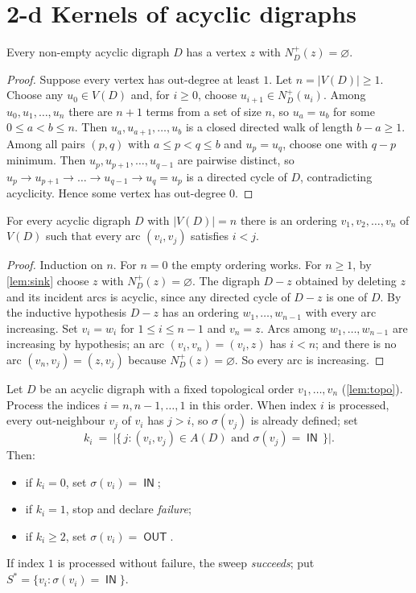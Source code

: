 \documentclass[11pt]{article}
\numberwithin{equation}{section}
\theoremstyle{plain}
\newcommand{\V}{V}
\newcommand{\A}{A}
\newcommand{\Np}{N^{+}}
\newcommand{\st}{\sigma}                   %
\DeclareMathOperator{\IN}{\mathsf{IN}}
\DeclareMathOperator{\OUT}{\mathsf{OUT}}
\begin{document}
\section{2-d Kernels of acyclic digraphs}
\label{sec:dag}

\begin{lemma}\label{lem:sink}
Every non-empty acyclic digraph $D$ has a vertex $z$ with $\Np_D(z)=\varnothing$.
\end{lemma}

\begin{proof}
Suppose every vertex has out-degree at least $1$. Let $n=|\V(D)|\ge 1$. Choose any
$u_0\in\V(D)$ and, for $i\ge 0$, choose $u_{i+1}\in\Np_D(u_i)$. Among $u_0,u_1,\dots,u_n$
there are $n+1$ terms from a set of size $n$, so $u_a=u_b$ for some $0\le a<b\le n$. Then
$u_a,u_{a+1},\dots,u_b$ is a closed directed walk of length $b-a\ge 1$. Among all pairs
$(p,q)$ with $a\le p<q\le b$ and $u_p=u_q$, choose one with $q-p$ minimum. Then
$u_p,u_{p+1},\dots,u_{q-1}$ are pairwise distinct, so
$u_p\to u_{p+1}\to\dots\to u_{q-1}\to u_q=u_p$ is a directed cycle of $D$, contradicting
acyclicity. Hence some vertex has out-degree $0$.
\end{proof}

\begin{lemma}\label{lem:topo}
For every acyclic digraph $D$ with $|\V(D)|=n$ there is an ordering
$v_1,v_2,\dots,v_n$ of $\V(D)$ such that every arc $(v_i,v_j)$ satisfies $i<j$.
\end{lemma}

\begin{proof}
Induction on $n$. For $n=0$ the empty ordering works. For $n\ge 1$, by \cref{lem:sink}
choose $z$ with $\Np_D(z)=\varnothing$. The digraph $D-z$ obtained by deleting $z$ and
its incident arcs is acyclic, since any directed cycle of $D-z$ is one of $D$. By the
inductive hypothesis $D-z$ has an ordering $w_1,\dots,w_{n-1}$ with every arc increasing.
Set $v_i=w_i$ for $1\le i\le n-1$ and $v_n=z$. Arcs among $w_1,\dots,w_{n-1}$ are
increasing by hypothesis; an arc $(v_i,v_n)=(v_i,z)$ has $i<n$; and there is no arc
$(v_n,v_j)=(z,v_j)$ because $\Np_D(z)=\varnothing$. So every arc is increasing.
\end{proof}

\begin{definition}\label{def:sweep}
Let $D$ be an acyclic digraph with a fixed topological order $v_1,\dots,v_n$
(\cref{lem:topo}). Process the indices $i=n,n-1,\dots,1$ in this order. When index $i$
is processed, every out-neighbour $v_j$ of $v_i$ has $j>i$, so $\st(v_j)$ is already
defined; set
\[
  k_i\ =\ \bigl|\{\,j:(v_i,v_j)\in\A(D)\text{ and }\st(v_j)=\IN\,\}\bigr|.
\]
Then:
\begin{itemize}[leftmargin=1.6em,itemsep=0.3ex]
\item if $k_i=0$, set $\st(v_i)=\IN$;
\item if $k_i=1$, stop and declare \emph{failure};
\item if $k_i\ge 2$, set $\st(v_i)=\OUT$.
\end{itemize}
If index $1$ is processed without failure, the sweep \emph{succeeds}; put
$S^\ast=\{v_i:\st(v_i)=\IN\}$.
\end{definition}
\end{document}

